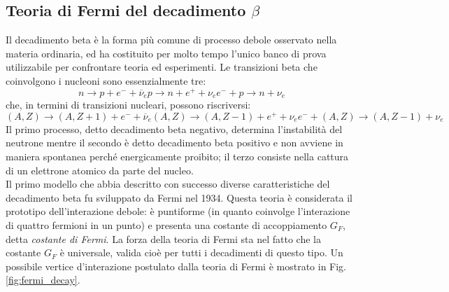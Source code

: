 \documentclass{subnucbo}
\begin{document}
\subsection{Teoria di Fermi del decadimento $\beta$}
Il decadimento beta è la forma più comune di processo debole osservato nella materia ordinaria, ed ha costituito per molto tempo l'unico banco di prova utilizzabile per confrontare teoria ed esperimenti. Le transizioni beta che coinvolgono i nucleoni sono essenzialmente tre:
\begin{subequations}
        \begin{equation}
                n \rightarrow p + e ^ { - } + \overline { \nu } _ { e }
                \label{eq:beta_neg}
        \end{equation}
        \begin{equation}
                p \rightarrow n + e ^ { + } + \nu _ { e }
                \label{eq:beta_pos}
        \end{equation}
        \begin{equation}
                e ^ { - } + p \rightarrow n + \nu _ { e }
                \label{eq:el_capture}
        \end{equation}
\end{subequations}
che, in termini di transizioni nucleari, possono riscriversi:
\begin{subequations}
        \begin{equation}
                ( A , Z ) \rightarrow ( A , Z + 1 ) + e ^ { - } + \overline { \nu } _ { e }
                \label{eq:beta_neg_trans}
        \end{equation}
        \begin{equation}
                ( A , Z ) \rightarrow ( A , Z - 1 ) + e ^ { + } + \nu _ { e }
                \label{eq:beta_pos_trans}
        \end{equation}
        \begin{equation}
                e ^ { - } + ( A , Z ) \rightarrow ( A , Z - 1 ) + \nu _ { e }
                \label{eq:el_capture_trans}
        \end{equation}
\end{subequations}
Il primo processo, detto decadimento beta negativo, determina l'instabilità del neutrone mentre il secondo è detto decadimento beta positivo e non avviene in maniera spontanea perché energicamente proibito; il terzo consiste nella cattura di un elettrone atomico da parte del nucleo. \\
Il primo modello che abbia descritto con successo diverse caratteristiche del decadimento beta fu sviluppato da Fermi nel 1934. Questa teoria è considerata il prototipo dell'interazione debole: è puntiforme (in quanto coinvolge l'interazione di quattro fermioni in un punto) e presenta una costante di accoppiamento $G_{F}$, detta \textit{costante di Fermi}. La forza della teoria di Fermi sta nel fatto che la costante $G_{F}$ è universale, valida cioè per tutti i decadimenti di questo tipo. Un possibile vertice d'interazione postulato dalla teoria di Fermi è mostrato in Fig. \ref{fig:fermi_decay}.\\
\end{document}
